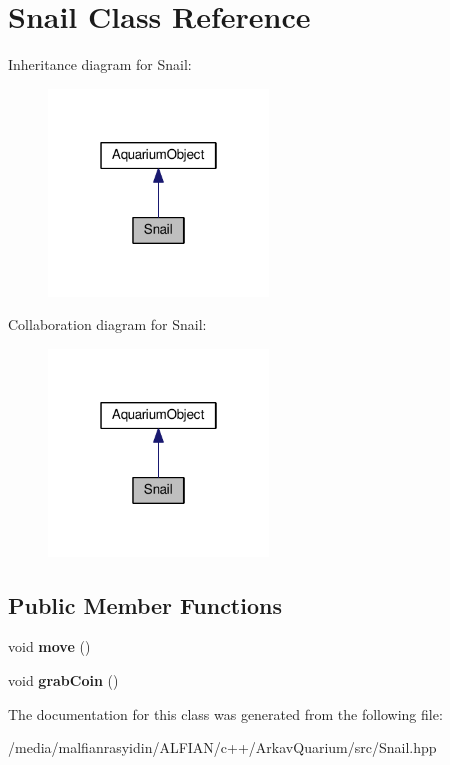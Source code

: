 \hypertarget{class_snail}{}\section{Snail Class Reference}
\label{class_snail}


Inheritance diagram for Snail\+:\nopagebreak
\begin{figure}[H]
\begin{center}
\leavevmode
\includegraphics[width=166pt]{class_snail__inherit__graph}
\end{center}
\end{figure}


Collaboration diagram for Snail\+:\nopagebreak
\begin{figure}[H]
\begin{center}
\leavevmode
\includegraphics[width=166pt]{class_snail__coll__graph}
\end{center}
\end{figure}
\subsection*{Public Member Functions}
\begin{DoxyCompactItemize}
\item 
\mbox{\label{class_snail_af5892ec122d9199480c813b74488256b}} 
void {\bfseries move} ()
\item 
\mbox{\label{class_snail_a877af082a9bc134a2cd2b4e97c94063d}} 
void {\bfseries grab\+Coin} ()
\end{DoxyCompactItemize}


The documentation for this class was generated from the following file\+:\begin{DoxyCompactItemize}
\item 
/media/malfianrasyidin/\+A\+L\+F\+I\+A\+N/c++/\+Arkav\+Quarium/src/Snail.\+hpp\end{DoxyCompactItemize}
